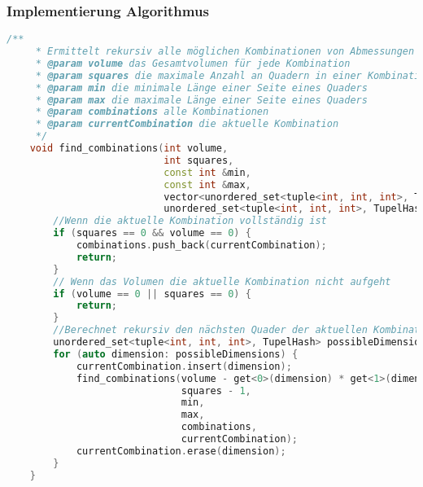 \documentclass[a4paper,10pt,ngerman]{scrartcl}
\begin{document}
    \subsubsection{Implementierung Algorithmus}
    \begin{lstlisting}[frame=single,language=C++,title=Methode find\_combinations,breaklines=true,label={lst:code_findCombinations}]
    /**
     * Ermittelt rekursiv alle möglichen Kombinationen von Abmessungen für beliebig viele Quader
     * @param volume das Gesamtvolumen für jede Kombination
     * @param squares die maximale Anzahl an Quadern in einer Kombination
     * @param min die minimale Länge einer Seite eines Quaders
     * @param max die maximale Länge einer Seite eines Quaders
     * @param combinations alle Kombinationen
     * @param currentCombination die aktuelle Kombination
     */
    void find_combinations(int volume,
                           int squares,
                           const int &min,
                           const int &max,
                           vector<unordered_set<tuple<int, int, int>, TupelHash>> &combinations,
                           unordered_set<tuple<int, int, int>, TupelHash> &currentCombination) {
        //Wenn die aktuelle Kombination vollständig ist
        if (squares == 0 && volume == 0) {
            combinations.push_back(currentCombination);
            return;
        }
        // Wenn das Volumen die aktuelle Kombination nicht aufgeht
        if (volume == 0 || squares == 0) {
            return;
        }
        //Berechnet rekursiv den nächsten Quader der aktuellen Kombination
        unordered_set<tuple<int, int, int>, TupelHash> possibleDimensions = find_dimensions(volume, min, max);
        for (auto dimension: possibleDimensions) {
            currentCombination.insert(dimension);
            find_combinations(volume - get<0>(dimension) * get<1>(dimension) * get<2>(dimension),
                              squares - 1,
                              min,
                              max,
                              combinations,
                              currentCombination);
            currentCombination.erase(dimension);
        }
    }
    \end{lstlisting}
\end{document}

